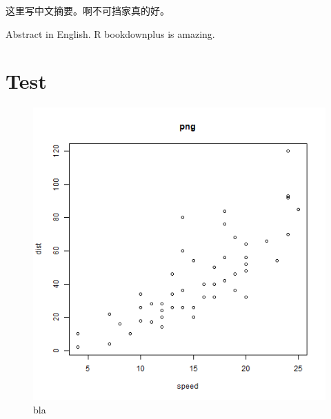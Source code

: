 \documentclass[UTF8, openany]{pkuthss}
\begin{document}
\frontmatter
\pagestyle{empty}
\setcounter{page}{0}

\begin{cabstract}

这里写中文摘要。啊不可挡家真的好。
	
\end{cabstract}

\cleardoublepage

\begin{eabstract}

Abstract in English. R bookdownplus is amazing.

\end{eabstract}

\cleardoublepage

\pagestyle{plain}

\tableofcontents

\cleardoublepage

\mainmatter

\hypertarget{test}{%
\chapter*{Test}\label{test}}


\begin{figure}
\includegraphics{figures/fig} \caption[bla]{bla}\label{fig:gb}
\end{figure}
\end{document}
